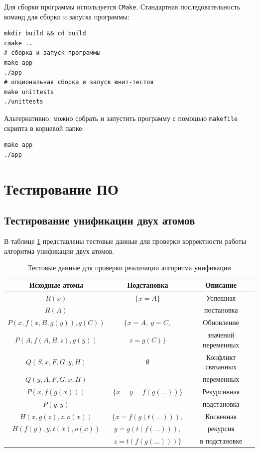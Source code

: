 Для сборки программы используется \texttt{CMake}. Стандартная последовательность команд для сборки и запуска программы:

\begin{verbatim}
mkdir build && cd build
cmake ..
# сборка и запуск программы
make app
./app
# опциональная сборка и запуск юнит-тестов
make unittests
./unittests
\end{verbatim}

Альтернативно, можно собрать и запустить программу с помощью \texttt{makefile} скрипта в корневой папке:

\begin{verbatim}
make app
./app
\end{verbatim}

\clearpage

\section{Тестирование ПО}

\subsection{Тестирование унификации двух атомов}

В таблице \ref{tab:unify} представлены тестовые данные для проверки корректности работы алгоритма унификации двух атомов.

\begin{table}[h!]
    \centering
    \caption{Тестовые данные для проверки реализации алгоритма унификации}
    \label{tab:unify}
    \begin{tabular}{|c|c|c|}
        \hline
        Исходные атомы & Подстановка & Описание \\
        \hline
        \hline
        $R(x)$ & $\{x=A\}$ & Успешная \\
        $R(A)$ & & постановка \\
        \hline
        $P(x, f(x, B, g(y)), g(C))$ & $\{x=A,~y=C,$ & Обновление \\
        $P(A, f(A, B, z), g(y))$ & $z=g(C)\}$ & значений переменных \\
        \hline
        $Q(S, x, F, G, y, H)$ & $\emptyset$ & Конфликт связанных \\
        $Q(y, A, F, G, x, H)$ & & переменных \\
        \hline
        $P(x, f(g(x)))$ & $\{x=y=f(g(...))\}$ & Рекурсивная \\
        $P(y, y)$ & & подстановка \\
        \hline
        $H(x, g(z), z, o(x))$ & $\{x=f(g(t(...))),$ & Косвенная \\
        $H(f(y), y, t(x), o(x))$ & $y=g(t(f(...))),$ & рекурсия \\
        & $z=t(f(g(...)))\}$ & в подстановке \\
        \hline 
    \end{tabular}
\end{table}

